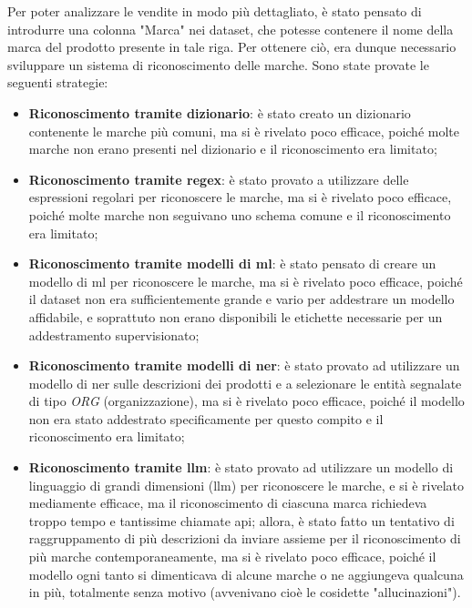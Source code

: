 Per poter analizzare le vendite in modo più dettagliato, è stato pensato di introdurre una colonna "Marca" nei dataset, che potesse contenere il nome della marca del prodotto presente in tale riga. Per ottenere ciò, era dunque necessario sviluppare un sistema di riconoscimento delle marche. Sono state provate le seguenti strategie:
\begin{itemize}
    \item \textbf{Riconoscimento tramite dizionario}: è stato creato un dizionario contenente le marche più comuni, ma si è rivelato poco efficace, poiché molte marche non erano presenti nel dizionario e il riconoscimento era limitato;
    \item \textbf{Riconoscimento tramite regex}: è stato provato a utilizzare delle espressioni regolari per riconoscere le marche, ma si è rivelato poco efficace, poiché molte marche non seguivano uno schema comune e il riconoscimento era limitato;
    \item \textbf{Riconoscimento tramite modelli di \gls{ml}\glsfirstoccur{}}: è stato pensato di creare un modello di \gls{ml} per riconoscere le marche, ma si è rivelato poco efficace, poiché il dataset non era sufficientemente grande e vario per addestrare un modello affidabile, e soprattuto non erano disponibili le etichette necessarie per un addestramento supervisionato;
    \item \textbf{Riconoscimento tramite modelli di \gls{ner}\glsfirstoccur{}}: è stato provato ad utilizzare un modello di \gls{ner} sulle descrizioni dei prodotti e a selezionare le entità segnalate di tipo \emph{ORG} (organizzazione), ma si è rivelato poco efficace, poiché il modello non era stato addestrato specificamente per questo compito e il riconoscimento era limitato;
    \item \textbf{Riconoscimento tramite \gls{llm}\glsfirstoccur{}}: è stato provato ad utilizzare un modello di linguaggio di grandi dimensioni (\gls{llm}) per riconoscere le marche, e si è rivelato mediamente efficace, ma il riconoscimento di ciascuna marca richiedeva troppo tempo e tantissime chiamate \gls{api}\glsfirstoccur{}; allora, è stato fatto un tentativo di raggruppamento di più descrizioni da inviare assieme per il riconoscimento di più marche contemporaneamente, ma si è rivelato poco efficace, poiché il modello ogni tanto si dimenticava di alcune marche o ne aggiungeva qualcuna in più, totalmente senza motivo (avvenivano cioè le cosidette "allucinazioni").
\end{itemize}


